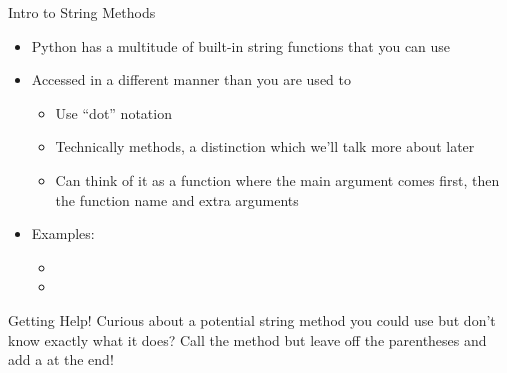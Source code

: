 \documentclass[pdf, aspectratio=169, 12pt]{beamer}
\begin{document}
\begin{frame}{Intro to String Methods}
	\vspace{3mm}
	\begin{itemize}
		\item Python has a multitude of built-in string functions that you can use
		\item Accessed in a different manner than you are used to
			\begin{itemize}
				\item Use ``dot'' notation
				\item Technically \alert{methods}, a distinction which we'll talk more about later
				\item Can think of it as a function where the main argument comes first, then the function name and extra arguments
			\end{itemize}
		\item Examples:
			\begin{itemize}
				\item {}
				\item {}
			\end{itemize}
	\end{itemize}
	\pause
	\begin{alertblock}{Getting Help!}
		Curious about a potential string method you could use but don't know exactly what it does? Call the method but leave off the parentheses and add a  at the end!
	\end{alertblock}
\end{frame}
\end{document}
